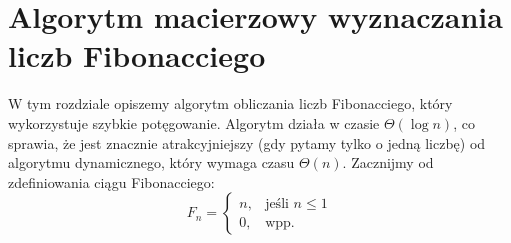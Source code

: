 \section{Algorytm macierzowy wyznaczania liczb Fibonacciego}

W tym rozdziale opiszemy algorytm obliczania liczb Fibonacciego, który wykorzystuje szybkie potęgowanie.
Algorytm działa w czasie $\Theta(\log{n})$, co sprawia, że jest znacznie atrakcyjniejszy (gdy pytamy tylko o jedną liczbę) od algorytmu dynamicznego, który wymaga czasu $\Theta(n)$.
Zacznijmy od zdefiniowania ciągu Fibonacciego:
\begin{equation*}
  F_n=\begin{cases}
    n, & \text{jeśli $n \leq1$}\\
    0, & \text{wpp.}
  \end{cases}
\end{equation*}

